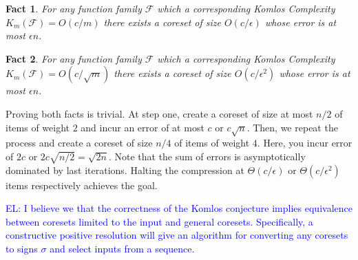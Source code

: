 \documentclass{article} %
\newtheorem{theorem}{Theorem}[section]
\newtheorem{fact}[theorem]{Fact}
\newcommand{\el}[1]{\textcolor{blue}{EL: #1}}
\newcommand{\eps}{\epsilon}
\newcommand{\F}{\mathcal{F}}
\begin{document}
\begin{fact}
For any function family $\F$ which a corresponding Komlos Complexity $K_m(\F) = O(c/m)$ there exists a coreset of size 
$O(c/\eps)$ whose error is at most $\eps n$.
\end{fact}
\begin{fact}
For any function family $\F$ which a corresponding Komlos Complexity $K_m(\F) = O(c/\sqrt{m})$ there exists a coreset of size 
$O(c/\eps^2)$ whose error is at most $\eps n$.
\end{fact}

\noindent Proving both facts is trivial. 
At step one, create a coreset of size at most $n/2$ of items of weight $2$ and incur an error of at most $c$ or $c \sqrt{n}$.
Then, we repeat the process and create a coreset of size $n/4$ of items of weight $4$. Here, you incur error of $2c$ or $2c\sqrt{n/2}  = \sqrt{2n}$.
Note that the sum of errors is asymptotically dominated by last iterations. 
Halting the compression at $\Theta(c/\eps)$ or $\Theta(c/\eps^2)$ items respectively achieves the goal.


%
%



\el{I believe we that the correctness of the Komlos conjecture implies equivalence between coresets limited to the input and general coresets. Specifically, a constructive positive resolution will give an algorithm for converting any coresets to signs $\sigma$ and select inputs from a sequence.}
\end{document}
